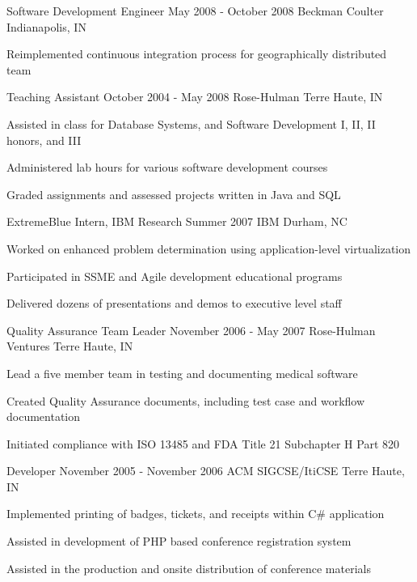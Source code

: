 {\begin{cventries}
  \cventry
  {Software Development Engineer}
  {May 2008 - October 2008}
  {Beckman Coulter}
  {Indianapolis, IN}
  {
    \begin{cvitems}
      \item Reimplemented continuous integration process for geographically distributed team
    \end{cvitems}
  }

  \cventry
  {Teaching Assistant}
  {October 2004 - May 2008}
  {Rose-Hulman}
  {Terre Haute, IN}
  {
    \begin{cvitems}
      \item Assisted in class for Database Systems, and Software Development I, II, II honors, and III
      \item Administered lab hours for various software development courses
      \item Graded assignments and assessed projects written in Java and SQL
    \end{cvitems}
  }

  \cventry
  {ExtremeBlue Intern, IBM Research}
  {Summer 2007}
  {IBM}
  {Durham, NC}
  {
    \begin{cvitems}
      \item Worked on enhanced problem determination using application-level virtualization
      \item Participated in SSME and Agile development educational programs
      \item Delivered dozens of presentations and demos to executive level staff
    \end{cvitems}
  }

  \cventry
  {Quality Assurance Team Leader}
  {November 2006 - May 2007}
  {Rose-Hulman Ventures}
  {Terre Haute, IN}
  {
    \begin{cvitems}
      \item Lead a five member team in testing and documenting medical software
      \item Created Quality Assurance documents, including test case and workflow documentation
      \item Initiated compliance with ISO 13485 and FDA Title 21 Subchapter H Part 820
    \end{cvitems}
  }

  \cventry
  {Developer}
  {November 2005 - November 2006}
  {ACM SIGCSE/ItiCSE}
  {Terre Haute, IN}
  {
    \begin{cvitems}
      \item Implemented printing of badges, tickets, and receipts within C\# application
      \item Assisted in development of PHP based conference registration system
      \item Assisted in the production and onsite distribution of conference materials
    \end{cvitems}
  }


\end{cventries}}
